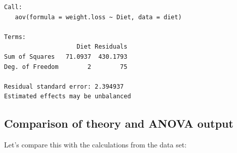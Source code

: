 \documentclass[
  letterpaper,
  DIV=11,
  numbers=noendperiod]{scrreprt}
\begin{document}
\begin{verbatim}
Call:
   aov(formula = weight.loss ~ Diet, data = diet)

Terms:
                    Diet Residuals
Sum of Squares   71.0937  430.1793
Deg. of Freedom        2        75

Residual standard error: 2.394937
Estimated effects may be unbalanced
\end{verbatim}

\hypertarget{comparison-of-theory-and-anova-output}{%
\subsection{Comparison of theory and ANOVA
output}\label{comparison-of-theory-and-anova-output}}

Let's compare this with the calculations from the data set:
\end{document}
